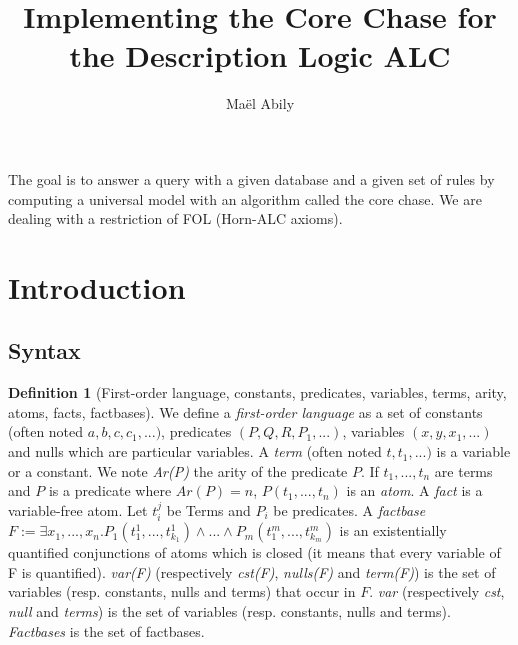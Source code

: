 \documentclass{article}
\title{Implementing the Core Chase for the Description Logic ALC}
\author{Maël Abily}	%
\theoremstyle{definition}
\newtheorem{definition}{Definition}[section]
\theoremstyle{remark}
\begin{document}
\maketitle						%



\begin{comment}
I modified : definition of atom, the first remark, definition 2 and 3 (including the definition of core),exemple of core, proof of proposal 1.2, the def of $Tr_{T}(F)$, the last exemple and the def of universal model.
\end{comment}

The goal is to answer a query with a given database and a given set of rules by computing a universal model with an algorithm called the core chase. We are dealing with a restriction of FOL (Horn-ALC axioms).

\tableofcontents					%
\section{Introduction}

\subsection{Syntax}

\begin{definition}[First-order language, constants, predicates, variables, terms, arity, atoms, facts, factbases] We define a \emph{first-order language} as a set of constants (often noted $a,b,c,c_{1},...)$, predicates $(P,Q,R,P_{1},...)$, variables $(x,y,x_{1},...)$ and nulls which are particular variables. A \emph{term}  (often noted $t,t_{1},...)$ is a variable or a constant. We note \emph{Ar(P)} the arity of the predicate $P$. If $t_1,...,t_n$ are terms and $P$ is a predicate where $Ar(P) = n$, $P(t_{1},...,t_{n})$ is an \emph{atom}. A \emph{fact} is a variable-free atom. Let $t_i^j$ be Terms and $P_i$ be predicates. A \emph{factbase} $F := \exists x_{1},...,x_{n}.P_{1}(t_{1}^{1},...,t_{k_{1}}^{1})\land ...\land P_{m}(t_{1}^{m},...,t_{k_{m}}^{m})$ is an existentially quantified conjunctions of atoms which is closed (it means that every variable of F is quantified). \emph{var(F)} (respectively \emph{cst(F)}, \emph{nulls(F)} and \emph{term(F)}) is the set of variables (resp. constants, nulls and terms) that occur in $F$. \emph{var} (respectively \emph{cst}, \emph{null} and \emph{terms}) is the set of variables (resp. constants, nulls and terms). \emph{Factbases} is the set of factbases.
\end{definition}
\end{document}

